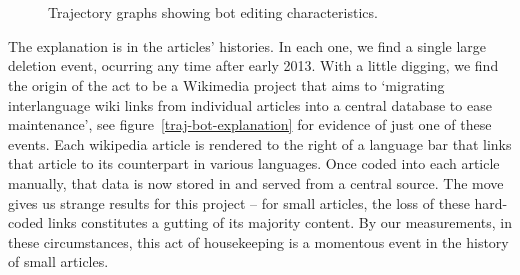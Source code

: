 \begin{figure}
{  }\\
  \\
\caption{Trajectory graphs showing bot editing characteristics.}
\end{figure}

The explanation is in the articles' histories. In each one, we find a
single large deletion event, ocurring any time after early 2013. With
a little digging, we find the origin of the act to be a Wikimedia
project that aims to `migrating interlanguage wiki links from
individual articles into a central database to ease
maintenance',\cite{wiki-interwikilinks} see
figure~\ref{traj-bot-explanation} for evidence of just one of these
events. Each wikipedia article is rendered to the right of a language
bar that links that article to its counterpart in various
languages. Once coded into each article manually, that data is now
stored in and served from a central source.\cite{wiki-blog-onwikidata}
The move gives us strange results for this project -- for small
articles, the loss of these hard-coded links constitutes a gutting of
its majority content. By our measurements, in these circumstances,
this act of housekeeping is a momentous event in the history of small
articles.

